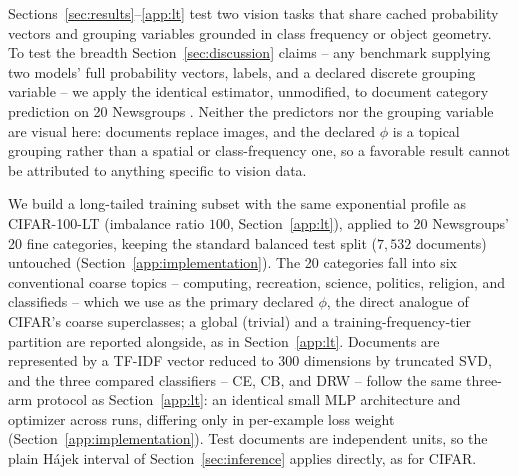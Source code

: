 Sections~\ref{sec:results}--\ref{app:lt} test two vision tasks that share cached
probability vectors and grouping variables grounded in class frequency or object geometry.
To test the breadth Section~\ref{sec:discussion} claims -- any benchmark supplying two
models' full probability vectors, labels, and a declared discrete grouping variable -- we
apply the identical estimator, unmodified, to document category prediction on 20
Newsgroups \citep{lang1995newsweeder}. Neither the predictors nor the grouping variable are
visual here: documents replace images, and the declared $\phi$ is a topical grouping
rather than a spatial or class-frequency one, so a favorable result cannot be attributed
to anything specific to vision data.

We build a long-tailed training subset with the same exponential profile as
CIFAR-100-LT (imbalance ratio $100$, Section~\ref{app:lt}), applied to 20
Newsgroups' 20 fine categories, keeping the standard balanced test split ($7{,}532$
documents) untouched (Section~\ref{app:implementation}). The 20 categories fall into
six conventional coarse topics -- computing, recreation, science, politics, religion,
and classifieds -- which we use as the primary declared $\phi$, the direct analogue of
CIFAR's coarse superclasses; a global (trivial) and a training-frequency-tier partition
are reported alongside, as in Section~\ref{app:lt}. Documents are represented by a
TF-IDF vector reduced to $300$ dimensions by truncated SVD, and the three compared
classifiers -- CE, CB, and DRW -- follow the same three-arm protocol as
Section~\ref{app:lt}: an identical small MLP architecture and optimizer across runs,
differing only in per-example loss weight (Section~\ref{app:implementation}). Test
documents are independent units, so the plain H\'ajek interval of Section~\ref{sec:inference}
applies directly, as for CIFAR.

